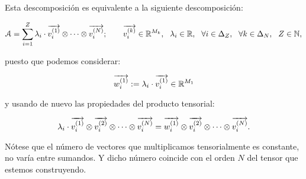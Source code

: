 \begin{observacion}
	Esta descomposición es equivalente a la siguiente descomposición:

	\begin{equation}
		\mathcal{A} = \sum_{i = 1}^Z \lambda_i \cdot \overrightarrow{v_i^{(1)}} \otimes \cdots \otimes \overrightarrow{v_i^{(N)}};
		\qquad \overrightarrow{v_i^{(k)}} \in \mathbb{R}^{M_k},
		\ \  \lambda_i \in \mathbb{R},
		\ \  \forall i \in \Delta_{Z},
		\ \  \forall k \in \Delta_{N},
		\ \  Z \in \mathbb{N},
	\end{equation}

	puesto que podemos considerar:

	\begin{equation}
		\overrightarrow{w_i^{(1)}} := \lambda_i \cdot \overrightarrow{v_i^{(1)}} \in \mathbb{R}^{M_1}
	\end{equation}

	y usando de nuevo las propiedades del producto tensorial:

	\begin{equation}
		\lambda_i \cdot \overrightarrow{v_i^{(1)}} \otimes \overrightarrow{v_i^{(2)}} \otimes \cdots \otimes \overrightarrow{v_i^{(N)}} = \overrightarrow{w_i^{(1)}} \otimes \overrightarrow{v_i^{(2)}} \otimes \cdots \otimes  \overrightarrow{v_i^{(N)}}.
	\end{equation}
\end{observacion}

\begin{observacion}
	Nótese que el número de vectores que multiplicamos tensorialmente es constante, no varía entre sumandos. Y dicho número coincide con el orden $N$ del tensor que estemos construyendo.
\end{observacion}


